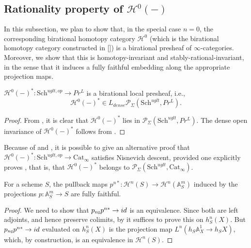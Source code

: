 \subsection{Rationality property of \texorpdfstring{$\mathcal{H}^0(-)$}{h}}
In this subsection, we plan to show that, in the special case $n=0$, the corresponding birational homotopy category $\mathcal{H}^0$ (which is the birational homotopy category constructed in [\cite{0bat}]) is a birational presheaf of $\infty$-categories. Moreover, we show that this is homotopy-invariant and stably-rational-invariant, in the sense that it induces a fully faithful embedding along the appropriate projection maps.
 \begin{thm}\label{H^b is bir local}
 $\mathcal{H}^{0}(-)^{*}:\mathrm{Sch}^{uglt,op}\to Pr^L$ is a birational local presheaf, i.e., $$\mathcal{H}^{0}(-)^*\in L_{dense}\mathcal{P}_{\Sigma}(\mathrm{Sch}^{uglt}, Pr^L).$$
    \end{thm}
\begin{proof}
From , it is clear that $\mathcal{H}^{0}(-)^{*}$ lies in $\mathcal{P}_{\Sigma}(\mathrm{Sch}^{uglt}, Pr^L)$. The dense open invariance of $\mathcal{H}^{0}(-)^{*}$ follows from .
\end{proof}
\begin{rem}
    Because of  and , it is possible to give an alternative proof that $\mathcal{H}^{0}(-)^*: \mathrm{Sch}^{uglt,op}\to \mathrm{Cat}_\infty$ satisfies Nisnevich descent, provided one explicitly proves , that is, that $\mathcal{H}^{0}(-)^*$ belongs to $\mathcal{P}_{\Sigma}(\mathrm{Sch}^{uglt}, \mathrm{Cat}_\infty)$.
\end{rem}
 
\begin{prop}\label{homotopy}
    For a scheme $S$, the pullback maps $p^{n*}: \mathcal{H}^{n}(S)\to \mathcal{H}^{n}(\mathbb{A}^m_S)$ induced by the projections $p:\mathbb{A}^m_S\to S$ are fully faithful.
\end{prop}
\begin{proof}We need to show that $p_{n{\mathord{\text{\tiny $\sharp$}}}}p^{n*}\to id$ is an equivalence. Since both are left adjoints, and hence preserve colimits, by  it suffices to prove this on $h^n_S(X)$. But $p_{n{\mathord{\text{\tiny $\sharp$}}}}p^{n*}\to id$ evaluated on $h^n_S(X)$ is the projection map $L^n(h_S\mathbb{A}^1_X\to h_SX)$, which, by construction, is an equivalence in $\mathcal{H}^n(S)$. 
\end{proof}

